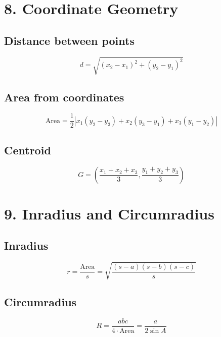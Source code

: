 \section*{8. Coordinate Geometry}
\subsection*{Distance between points}
\[
d = \sqrt{(x_2 - x_1)^2 + (y_2 - y_1)^2}
\]

\subsection*{Area from coordinates}
\[
\text{Area} = \frac{1}{2} \left| x_1(y_2 - y_3) + x_2(y_3 - y_1) + x_3(y_1 - y_2) \right|
\]

\subsection*{Centroid}
\[
G = \left( \frac{x_1 + x_2 + x_3}{3}, \frac{y_1 + y_2 + y_3}{3} \right)
\]

\section*{9. Inradius and Circumradius}
\subsection*{Inradius}
\[
r = \frac{\text{Area}}{s} = \sqrt{\frac{(s-a)(s-b)(s-c)}{s}}
\]

\subsection*{Circumradius}
\[
R = \frac{abc}{4 \cdot \text{Area}} = \frac{a}{2 \sin A}
\]
